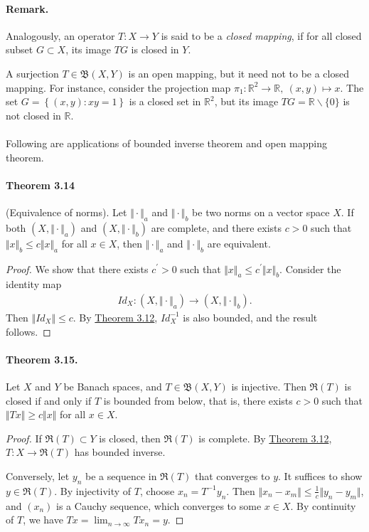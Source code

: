 \documentclass{article}
\begin{document}
\paragraph{Remark.} Analogously, an operator $T:X\to Y$ is said to be a \textit{closed mapping}, if for all closed subset $G\subset X$, its image $TG$ is closed in $Y$.

A surjection $T\in\mathfrak{B}(X,Y)$ is an open mapping, but it need not to be a closed mapping. For instance, consider the projection map $\pi_1:\mathbb{R}^2\to\mathbb{R},\ (x,y)\mapsto x$. The set $G=\left\{(x,y):xy=1\right\}$ is a closed set in $\mathbb{R}^2$, but its image $TG=\mathbb{R}\backslash\{0\}$ is not closed in $\mathbb{R}$.

\paragraph{} Following are applications of bounded inverse theorem and open mapping theorem.
\paragraph{Theorem 3.14\label{thm:3.14}} (Equivalence of norms). Let $\Vert\cdot\Vert_a$ and $\Vert\cdot\Vert_b$ be two norms on a vector space $X$. If both $(X,\Vert\cdot\Vert_a)$ and $(X,\Vert\cdot\Vert_b)$ are complete, and there exists $c>0$ such that $\Vert x\Vert_b\leq c\Vert x\Vert_a$ for all $x\in X$, then $\Vert\cdot\Vert_a$ and $\Vert\cdot\Vert_b$ are equivalent.
\begin{proof}
We show that there exists $c^\prime>0$ such that $\Vert x\Vert_a\leq c^\prime\Vert x\Vert_b$. Consider the identity map
\begin{align*}
	Id_X:(X,\Vert\cdot\Vert_a)\to(X,\Vert\cdot\Vert_b).
\end{align*}
Then $\Vert Id_X\Vert \leq c$. By \hyperref[thm:3.12]{Theorem 3.12}, $Id_X^{-1}$ is also bounded, and the result follows.
\end{proof}

\paragraph{Theorem 3.15.\label{thm:3.15}} Let $X$ and $Y$ be Banach spaces, and $T\in\mathfrak{B}(X,Y)$ is injective. Then $\mathfrak{R}(T)$ is closed if and only if $T$ is bounded from below, that is, there exists $c>0$ such that $\Vert Tx\Vert\geq c\Vert x\Vert$ for all $x\in X$.
\begin{proof}
If $\mathfrak{R}(T)\subset Y$ is closed, then $\mathfrak{R}(T)$ is complete. By \hyperref[thm:3.12]{Theorem 3.12}, $T:X\to\mathfrak{R}(T)$ has bounded inverse. 

Conversely, let $y_n$ be a sequence in $\mathfrak{R}(T)$ that converges to $y$. It suffices to show $y\in\mathfrak{R}(T)$. By injectivity of $T$, choose $x_n=T^{-1}y_n$. Then $\Vert x_n - x_m\Vert\leq\frac{1}{c}\Vert y_n - y_m\Vert$, and $(x_n)$ is a Cauchy sequence, which converges to some $x\in X$. By continuity of $T$, we have $Tx=\lim_{n\to\infty} Tx_n = y$.
\end{proof}
\end{document}
